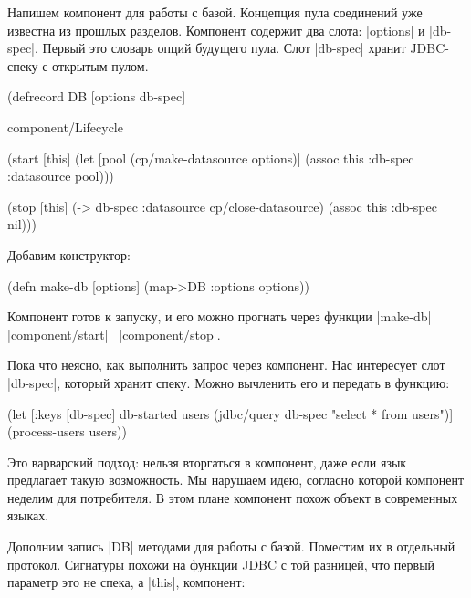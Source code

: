 Напишем компонент для работы с базой. Концепция пула соединений уже известна из
прошлых разделов. Компонент содержит два слота: \spverb|options| и
\spverb|db-spec|. Первый это словарь опций будущего пула. Слот \spverb|db-spec|
хранит JDBC-спеку с открытым пулом.

\begin{english}
  \begin{clojure}
(defrecord DB
    [options db-spec]

  component/Lifecycle

  (start [this]
    (let [pool (cp/make-datasource options)]
      (assoc this :db-spec {:datasource pool})))

  (stop [this]
    (-> db-spec :datasource cp/close-datasource)
    (assoc this :db-spec nil)))
  \end{clojure}
\end{english}

Добавим конструктор:

\begin{english}
  \begin{clojure}
(defn make-db [options]
  (map->DB {:options options}))
  \end{clojure}
\end{english}

Компонент готов к запуску, и его можно прогнать через функции
\spverb|make-db|~\arr{} \spverb|component/start|~\arr{} \spverb|component/stop|.

Пока что неясно, как выполнить запрос через компонент. Нас интересует слот
\spverb|db-spec|, который хранит спеку. Можно вычленить его и передать в
функцию:

\begin{english}
  \begin{clojure}
(let [{:keys [db-spec]} db-started
      users (jdbc/query db-spec "select * from users")]
  (process-users users))
  \end{clojure}
\end{english}

Это варварский подход: нельзя вторгаться в компонент, даже если язык предлагает
такую возможность. Мы нарушаем идею, согласно которой компонент неделим для
потребителя. В этом плане компонент похож объект в современных языках.

Дополним запись \spverb|DB| методами для работы с базой. Поместим их в отдельный
протокол. Сигнатуры похожи на функции JDBC с той разницей, что первый параметр
это не спека, а \spverb|this|, компонент:

